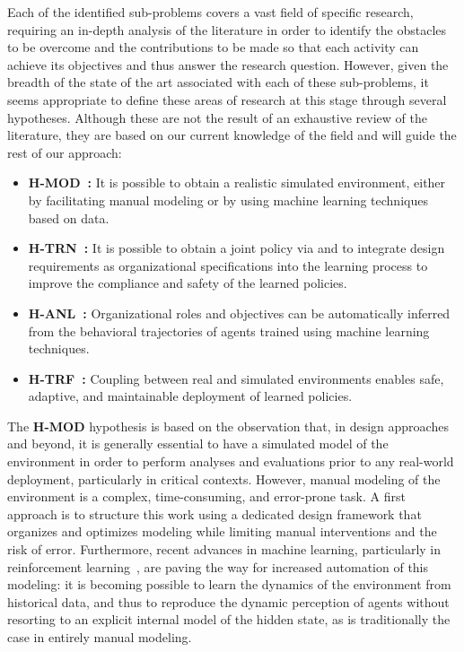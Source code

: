 Each of the identified sub-problems covers a vast field of specific research, requiring an in-depth analysis of the literature in order to identify the obstacles to be overcome and the contributions to be made so that each activity can achieve its objectives and thus answer the research question. However, given the breadth of the state of the art associated with each of these sub-problems, it seems appropriate to define these areas of research at this stage through several hypotheses. Although these are not the result of an exhaustive review of the literature, they are based on our current knowledge of the field and will guide the rest of our approach:

\begin{itemize}
  \item \textbf{\textbf{H-MOD}~:} It is possible to obtain a realistic simulated environment, either by facilitating manual modeling or by using machine learning techniques based on data.
  \item \textbf{\textbf{H-TRN}~:} It is possible to obtain a joint policy via  and to integrate design requirements as organizational specifications into the learning process to improve the compliance and safety of the learned policies.
  \item \textbf{\textbf{H-ANL}~:} Organizational roles and objectives can be automatically inferred from the behavioral trajectories of agents trained using machine learning techniques.
  \item \textbf{\textbf{H-TRF}~:} Coupling between real and simulated environments enables safe, adaptive, and maintainable deployment of learned policies.
\end{itemize}

\noindent The \textbf{H-MOD} hypothesis is based on the observation that, in  design approaches and beyond, it is generally essential to have a simulated model of the environment in order to perform analyses and evaluations prior to any real-world deployment, particularly in critical contexts. However, manual modeling of the environment is a complex, time-consuming, and error-prone task. A first approach is to structure this work using a dedicated design framework that organizes and optimizes modeling while limiting manual interventions and the risk of error. Furthermore, recent advances in machine learning, particularly in reinforcement learning~\cite{ha2018recurrent}, are paving the way for increased automation of this modeling: it is becoming possible to learn the dynamics of the environment from historical data, and thus to reproduce the dynamic perception of agents without resorting to an explicit internal model of the hidden state, as is traditionally the case in entirely manual modeling.

